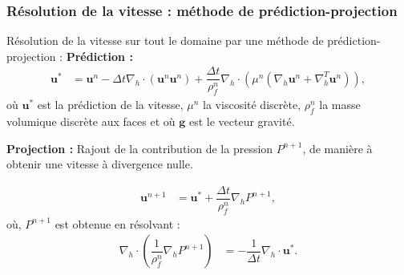 \documentclass{beamer}
\newcommand{\vect}[1]{\bm{#1}}
\newcommand{\npl}{{n+1}}
\renewcommand{\frac}{\dfrac}
\begin{document}
\begin{frame}
    \frametitle{Résolution de la vitesse : méthode de prédiction-projection}
    \footnotesize
    \begin{ceablock}{Résolution de la vitesse sur tout le domaine par une méthode de prédiction-projection :}
	\textbf{Prédiction :}
	\begin{align} 
		\vect{u}^* &= \vect{u}^n - \Delta t \nabla_h \cdot (\vect{u}^n \vect{u}^n) + \frac{\Delta t}{\rho^n_f} \nabla_h \cdot(\mu^n(\nabla_h \vect{u}^n+\nabla^T_h \vect{u}^n)),
	\end{align}
	\color{cea_texte!70}où $\vect{u}^*$ est la prédiction de la vitesse, $\mu^n$ la viscosité discrète, $\rho^n_f$ la masse volumique discrète aux faces  et où $\vect{g}$ est le vecteur gravité.\color{cea_texte}\\  %
	\vspace{0.3cm}

	\textbf{Projection :}
Rajout de la contribution de la pression $P^\npl$, de manière à obtenir une vitesse à divergence nulle.

	\begin{align}
		\vect{u}^{n+1} &= \vect{u}^* + \frac{\Delta t}{\rho^n_f} \nabla_h P^{n+1},
	\end{align}
	\color{cea_texte!70}où, $P^{n+1}$ est obtenue en résolvant : \color{cea_texte}
\begin{align}
\label{eq:Pression}
					 \nabla_h \cdot  \left( \frac{1}{\rho^n_f} \nabla_h P^\npl \right) &=  -\frac{1}{\Delta t} \nabla_h \cdot \vect{u}^*. 
\end{align}
	\end{ceablock}

\end{frame}
\end{document}
